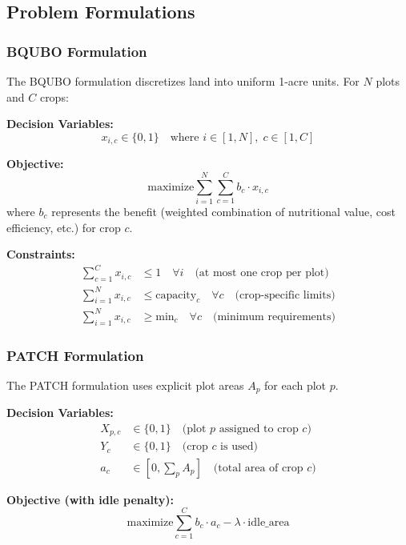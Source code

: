 \documentclass[11pt,a4paper]{article}
\begin{document}
\subsection{Problem Formulations}

\subsubsection{BQUBO Formulation}

The BQUBO formulation discretizes land into uniform 1-acre units. For $N$ plots and $C$ crops:

\textbf{Decision Variables:}
\begin{equation}
x_{i,c} \in \{0,1\} \quad \text{where } i \in [1,N], \; c \in [1,C]
\end{equation}

\textbf{Objective:}
\begin{equation}
\text{maximize} \sum_{i=1}^{N} \sum_{c=1}^{C} b_c \cdot x_{i,c}
\end{equation}
where $b_c$ represents the benefit (weighted combination of nutritional value, cost efficiency, etc.) for crop $c$.

\textbf{Constraints:}
\begin{align}
\sum_{c=1}^{C} x_{i,c} &\leq 1 \quad \forall i \quad \text{(at most one crop per plot)} \\
\sum_{i=1}^{N} x_{i,c} &\leq \text{capacity}_c \quad \forall c \quad \text{(crop-specific limits)} \\
\sum_{i=1}^{N} x_{i,c} &\geq \text{min}_c \quad \forall c \quad \text{(minimum requirements)}
\end{align}

\subsubsection{PATCH Formulation}

The PATCH formulation uses explicit plot areas $A_p$ for each plot $p$.

\textbf{Decision Variables:}
\begin{align}
X_{p,c} &\in \{0,1\} \quad \text{(plot $p$ assigned to crop $c$)} \\
Y_c &\in \{0,1\} \quad \text{(crop $c$ is used)} \\
a_c &\in [0, \sum_p A_p] \quad \text{(total area of crop $c$)}
\end{align}

\textbf{Objective (with idle penalty):}
\begin{equation}
\text{maximize} \sum_{c=1}^{C} b_c \cdot a_c - \lambda \cdot \text{idle\_area}
\end{equation}
\end{document}

